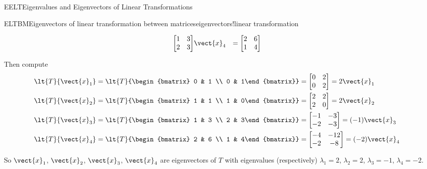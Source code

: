 \begin{subsect}{EELT}{Eigenvalues and Eigenvectors of Linear Transformations}
\begin{example}{ELTBM}{Eigenvectors of linear transformation between matrices}{eigenvectors!linear transformation}
\begin{para}
\begin{align*}
\begin{bmatrix}
 1 & 3 \\ 2 & 3
\end{bmatrix}
&
\vect{x}_4
&=
\begin{bmatrix}
 2 & 6 \\ 1 & 4
\end{bmatrix}
%
\end{align*}
\end{para}
%
\begin{para}Then compute
%
\begin{align*}
\lt{T}{\vect{x}_1}
&=
\lt{T}{\begin{bmatrix} 0 & 1 \\ 0 & 1\end{bmatrix}}
=
\begin{bmatrix}
 0 & 2 \\ 0 & 2
\end{bmatrix}
=
2\vect{x}_1\\
%
\lt{T}{\vect{x}_2}
&=
\lt{T}{\begin{bmatrix} 1 & 1 \\ 1 & 0\end{bmatrix}}
=
\begin{bmatrix}
 2 & 2 \\ 2 & 0
\end{bmatrix}
=
2\vect{x}_2\\
%
\lt{T}{\vect{x}_3}
&=
\lt{T}{\begin{bmatrix} 1 & 3 \\ 2 & 3\end{bmatrix}}
=
\begin{bmatrix}
 -1 & -3 \\ -2 & -3
\end{bmatrix}
=
(-1)\vect{x}_3\\
%
\lt{T}{\vect{x}_4}
&=
\lt{T}{\begin{bmatrix} 2 & 6 \\ 1 & 4\end{bmatrix}}
=
\begin{bmatrix}
 -4 & -12 \\ -2 & -8
\end{bmatrix}
=
(-2)\vect{x}_4\\
%
\end{align*}
\end{para}
%
\begin{para}So $\vect{x}_1$, $\vect{x}_2$, $\vect{x}_3$, $\vect{x}_4$ are eigenvectors of $T$ with eigenvalues (respectively) $\lambda_1=2$, $\lambda_2=2$, $\lambda_3=-1$, $\lambda_4=-2$.\end{para}

\end{example}
\end{subsect}
